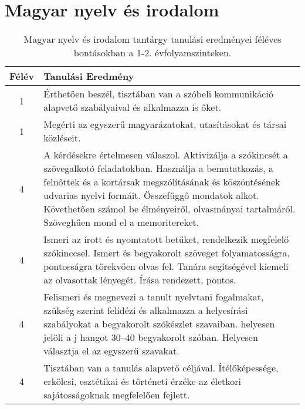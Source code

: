         \section{Magyar nyelv és irodalom}

       
           \begin{longtable}{c | p{12cm} }
            \caption[Magyar nyelv és irodalom 1-2.]{Magyar nyelv és irodalom tantárgy tanulási eredményei féléves bontásokban a 1-2. évfolyamszinteken. }  \\

            \textbf{Félév} & \textbf{Tanulási Eredmény} \\
            \hline
            \endhead
                                
                                          1 &  Érthetően beszél, tisztában van a szóbeli kommunikáció alapvető szabályaival és alkalmazza is őket. \\ \hline
                                          1 &  Megérti az egyszerű magyarázatokat, utasításokat és társai közléseit. \\ \hline
                                      
                                
                                          4 &  A kérdésekre értelmesen válaszol. Aktivizálja a szókincsét a szövegalkotó feladatokban. Használja a bemutatkozás, a felnőttek és a kortársak megszólításának és köszöntésének udvarias nyelvi formáit. Összefüggő mondatok alkot. Követhetően számol be élményeiről, olvasmányai tartalmáról. Szöveghűen mond el a memoritereket. \\ \hline
                                          4 &  Ismeri az írott és nyomtatott betűket, rendelkezik megfelelő szókinccsel. Ismert és begyakorolt szöveget folyamatosságra, pontosságra törekvően olvas fel. Tanára segítségével kiemeli az olvasottak lényegét. Írása rendezett, pontos. \\ \hline
                                          4 &  Felismeri és megnevezi a tanult nyelvtani fogalmakat, szükség szerint felidézi és alkalmazza a helyesírási szabályokat a begyakorolt szókészlet szavaiban. helyesen jelöli a j hangot 30–40 begyakorolt szóban. Helyesen választja el az egyszerű szavakat. \\ \hline
                                          4 &  Tisztában van a tanulás alapvető céljával. Ítélőképessége, erkölcsi, esztétikai és történeti érzéke az életkori sajátosságoknak megfelelően fejlett. \\ \hline
                                      
                        \end{longtable}
            \clearpage

